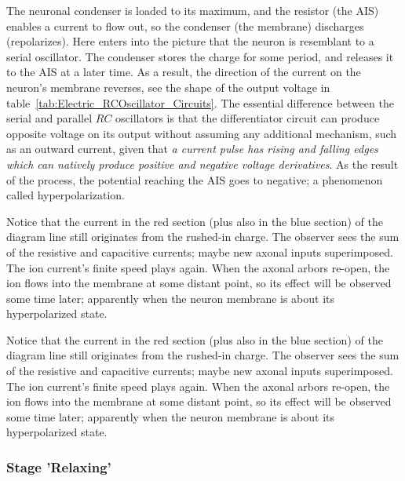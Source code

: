 The neuronal condenser is loaded to its maximum, and the resistor (the \gls{AIS})
enables a current to flow out, so the condenser (the membrane) discharges (repolarizes).
Here enters into the picture that the neuron is resemblant to a serial oscillator.
The condenser stores the charge for some period, and releases it to the \gls{AIS}
at a later time. As a result, the direction of the current on the neuron's
membrane reverses, see the shape of the output voltage in table~\ref{tab:Electric_RCOscillator_Circuits}.
The essential difference between the serial and parallel $RC$ oscillators is
that the differentiator circuit can produce opposite voltage on its output
without assuming any additional mechanism, such as an outward current,
given that \textit{a current pulse has rising and falling edges which can natively produce 
positive and negative voltage derivatives}.
As the result of the process, the potential reaching the AIS goes to negative;
a phenomenon called hyperpolarization.

\fi

\ifx\magyar\undefined

Notice that the current in the red section (plus also in the blue section) 
of the diagram line still originates from the rushed-in charge. The observer
sees the sum of the resistive and capacitive currents;
maybe new axonal inputs superimposed.
The ion current's finite speed plays again. When the axonal arbors re-open,
the ion flows into the membrane at some distant point, so its effect
will be observed some time later; apparently when the neuron membrane is
about its hyperpolarized state. 

\else

Notice that the current in the red section (plus also in the blue section) 
of the diagram line still originates from the rushed-in charge. The observer
sees the sum of the resistive and capacitive currents;
maybe new axonal inputs superimposed.
The ion current's finite speed plays again. When the axonal arbors re-open,
the ion flows into the membrane at some distant point, so its effect
will be observed some time later; apparently when the neuron membrane is
about its hyperpolarized state. 

\fi

\ifx\magyar\undefined


\subsubsection[Relaxing]{Stage 'Relaxing'\label{sec:Single-OperationRelaxing}}
\else

